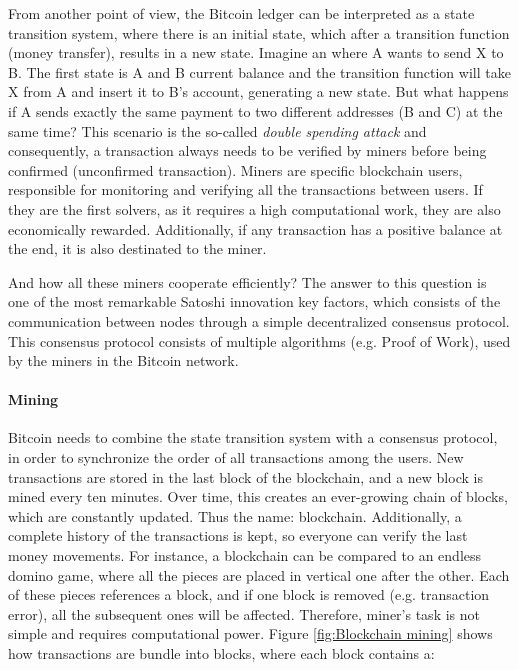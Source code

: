 From another point of view, the Bitcoin ledger can be interpreted as a state transition system, where there is an initial state, which after a transition function (money transfer), results in a new state. Imagine an where A wants to send X to B. The first state is A and B current balance and the transition function will take X from A and insert it to B's account, generating a new state. But what happens if A sends exactly the same payment to two different addresses (B and C) at the same time? This scenario is the so-called \textit{double spending attack} and consequently, a transaction always needs to be verified by miners before being confirmed (unconfirmed transaction). Miners are specific blockchain users, responsible for monitoring and verifying all the transactions between users. If they are the first solvers, as it requires a high computational work, they are also economically rewarded. Additionally, if any transaction has a positive balance at the end, it is also destinated to the miner.

And how all these miners cooperate efficiently? The answer to this question is one of the most remarkable Satoshi innovation key factors, which consists of the communication between nodes through a simple decentralized consensus protocol. This consensus protocol consists of multiple algorithms (e.g. Proof of Work), used by the miners in the Bitcoin network.

\paragraph{Mining}

Bitcoin needs to combine the state transition system with a consensus protocol, in order to synchronize the order of all transactions among the users. 
New transactions are stored in the last block of the blockchain, and a new block is mined every ten minutes. Over time, this creates an ever-growing chain of blocks, which are constantly updated. Thus the name: blockchain. Additionally, a complete history of the transactions is kept, so everyone can verify the last money movements. For instance, a blockchain can be compared to an endless domino game, where all the pieces are placed in vertical one after the other. Each of these pieces references a block, and if one block is removed (e.g. transaction error), all the subsequent ones will be affected. Therefore, miner's task is not simple and requires computational power. Figure \ref{fig:Blockchain mining} shows how transactions are bundle into blocks, where each block contains a:

